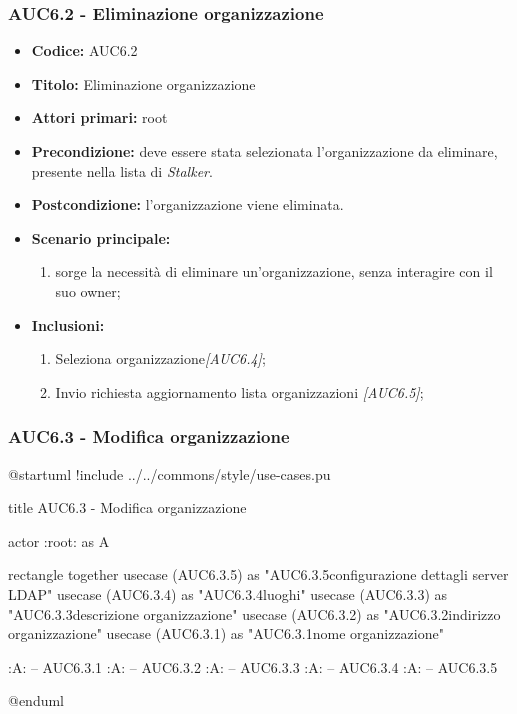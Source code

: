 \documentclass[casi-duso]{subfiles}
\begin{document}
\subsubsection{AUC6.2 - Eliminazione organizzazione}%
\label{subsub:AUC6.2}
\begin{itemize}
  \item \textbf{Codice:} AUC6.2
  \item \textbf{Titolo:} Eliminazione organizzazione
  \item \textbf{Attori primari:} root
  \item \textbf{Precondizione:} deve essere stata selezionata l'organizzazione da eliminare, presente nella lista di \emph{Stalker}.
  \item \textbf{Postcondizione:} l'organizzazione viene eliminata.
  \item \textbf{Scenario principale:}
  \begin{enumerate}
    \item sorge la necessità di eliminare un'organizzazione, senza interagire con il suo owner;
  \end{enumerate}
  \item \textbf{Inclusioni:}
  \begin{enumerate}
    \item Seleziona organizzazione\emph{[AUC6.4]};
    \item Invio richiesta aggiornamento lista organizzazioni \emph{[AUC6.5]};
  \end{enumerate}
\end{itemize}

\subsubsection{AUC6.3 - Modifica organizzazione}%
\label{subsub:AUC6.3}

\begin{plantuml}
@startuml
!include ../../commons/style/use-cases.pu

title AUC6.3 - Modifica organizzazione

actor :root: as A

rectangle {
  together {
    usecase (AUC6.3.5) as "AUC6.3.5\nModifica configurazione dettagli server LDAP"
    usecase (AUC6.3.4) as "AUC6.3.4\nGestione luoghi"
    usecase (AUC6.3.3) as "AUC6.3.3\nModifica descrizione organizzazione"
    usecase (AUC6.3.2) as "AUC6.3.2\nModifica indirizzo organizzazione"
    usecase (AUC6.3.1) as "AUC6.3.1\nModifica nome organizzazione" 
  }
}

:A: -- AUC6.3.1
:A: -- AUC6.3.2
:A: -- AUC6.3.3
:A: -- AUC6.3.4
:A: -- AUC6.3.5

@enduml
\end{plantuml}
\end{document}
